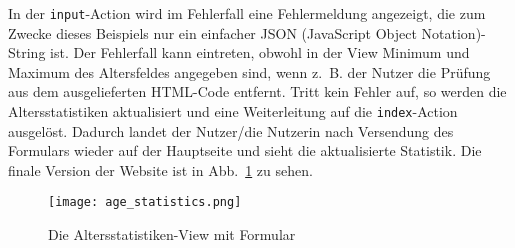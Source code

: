 In der \lstinline|input|-Action wird im Fehlerfall eine Fehlermeldung angezeigt, die zum Zwecke dieses Beispiels nur ein einfacher JSON (JavaScript Object Notation)-String ist.
Der Fehlerfall kann eintreten, obwohl in der View Minimum und Maximum des Altersfeldes angegeben sind, wenn z.~B. der Nutzer die Prüfung aus dem ausgelieferten HTML-Code entfernt.
Tritt kein Fehler auf, so werden die Altersstatistiken aktualisiert und eine Weiterleitung auf die \lstinline|index|-Action ausgelöst.
Dadurch landet der Nutzer/die Nutzerin nach Versendung des Formulars wieder auf der Hauptseite und sieht die aktualisierte Statistik.
Die finale Version der Website ist in Abb.~\ref{fig:die_altersstatistiken_view_mit_formular} zu sehen.

\begin{figure}
\centering
\texttt{[image: age\_statistics.png]}
\caption{Die Altersstatistiken-View mit Formular}
\label{fig:die_altersstatistiken_view_mit_formular}
\end{figure}




